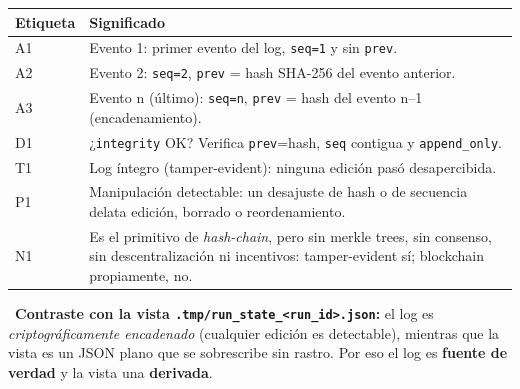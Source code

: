 \documentclass[11pt,a4paper]{article}
\begin{document}
\begin{center}

\vspace{6pt}
\begin{tcolorbox}[cajaContenido, title={\faIcon{table}~Leyenda de etiquetas}]
\small
\begin{tabularx}{\linewidth}{@{}>{\centering\arraybackslash}p{1.4cm}X@{}}
\toprule
\textbf{Etiqueta} & \textbf{Significado} \\ \midrule
A1 & Evento 1: primer evento del log, \texttt{seq=1} y sin \texttt{prev}. \\
A2 & Evento 2: \texttt{seq=2}, \texttt{prev} = hash SHA-256 del evento anterior. \\
A3 & Evento n (último): \texttt{seq=n}, \texttt{prev} = hash del evento n--1 (encadenamiento). \\
D1 & ¿\texttt{integrity} OK? Verifica \texttt{prev}=hash, \texttt{seq} contigua y \texttt{append\_only}. \\
T1 & Log íntegro (tamper-evident): ninguna edición pasó desapercibida. \\
P1 & Manipulación detectable: un desajuste de hash o de secuencia delata edición, borrado o reordenamiento. \\
N1 & Es el primitivo de \emph{hash-chain}, pero sin merkle trees, sin consenso, sin descentralización ni incentivos: tamper-evident sí; blockchain propiamente, no. \\
\bottomrule
\end{tabularx}
\end{tcolorbox}
\end{center}

~\textbf{Contraste con la vista \texttt{.tmp/run\_state\_<run\_id>.json}:} el log es
\emph{criptográficamente encadenado} (cualquier edición es detectable), mientras que la
vista es un JSON plano que se sobrescribe sin rastro. Por eso el log es \textbf{fuente de
verdad} y la vista una \textbf{derivada}.
\end{document}
